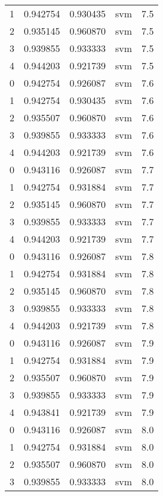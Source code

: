 \begin{tabular}{rrrlr}
     1 & 0.942754 & 0.930435 &      svm &        7.5 \\
     2 & 0.935145 & 0.960870 &      svm &        7.5 \\
     3 & 0.939855 & 0.933333 &      svm &        7.5 \\
     4 & 0.944203 & 0.921739 &      svm &        7.5 \\
     0 & 0.942754 & 0.926087 &      svm &        7.6 \\
     1 & 0.942754 & 0.930435 &      svm &        7.6 \\
     2 & 0.935507 & 0.960870 &      svm &        7.6 \\
     3 & 0.939855 & 0.933333 &      svm &        7.6 \\
     4 & 0.944203 & 0.921739 &      svm &        7.6 \\
     0 & 0.943116 & 0.926087 &      svm &        7.7 \\
     1 & 0.942754 & 0.931884 &      svm &        7.7 \\
     2 & 0.935145 & 0.960870 &      svm &        7.7 \\
     3 & 0.939855 & 0.933333 &      svm &        7.7 \\
     4 & 0.944203 & 0.921739 &      svm &        7.7 \\
     0 & 0.943116 & 0.926087 &      svm &        7.8 \\
     1 & 0.942754 & 0.931884 &      svm &        7.8 \\
     2 & 0.935145 & 0.960870 &      svm &        7.8 \\
     3 & 0.939855 & 0.933333 &      svm &        7.8 \\
     4 & 0.944203 & 0.921739 &      svm &        7.8 \\
     0 & 0.943116 & 0.926087 &      svm &        7.9 \\
     1 & 0.942754 & 0.931884 &      svm &        7.9 \\
     2 & 0.935507 & 0.960870 &      svm &        7.9 \\
     3 & 0.939855 & 0.933333 &      svm &        7.9 \\
     4 & 0.943841 & 0.921739 &      svm &        7.9 \\
     0 & 0.943116 & 0.926087 &      svm &        8.0 \\
     1 & 0.942754 & 0.931884 &      svm &        8.0 \\
     2 & 0.935507 & 0.960870 &      svm &        8.0 \\
     3 & 0.939855 & 0.933333 &      svm &        8.0 \\

\end{tabular}
